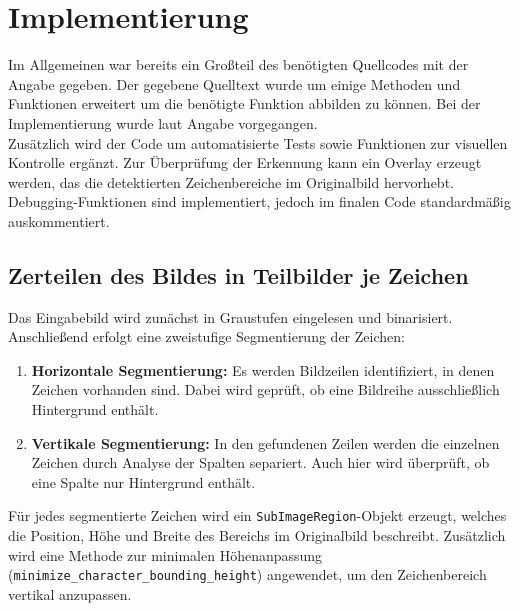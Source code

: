 \section{Implementierung}
Im Allgemeinen war bereits ein Großteil des benötigten Quellcodes mit der Angabe gegeben. Der gegebene Quelltext wurde um einige Methoden und Funktionen erweitert
um die benötigte Funktion abbilden zu können. Bei der Implementierung wurde laut Angabe vorgegangen. \\

Zusätzlich wird der Code um automatisierte Tests sowie Funktionen zur visuellen Kontrolle ergänzt. Zur Überprüfung der Erkennung kann ein Overlay erzeugt werden, das die detektierten Zeichenbereiche im Originalbild hervorhebt. Debugging-Funktionen sind implementiert, jedoch im finalen Code standardmäßig auskommentiert.

\subsection{Zerteilen des Bildes in Teilbilder je Zeichen}
Das Eingabebild wird zunächst in Graustufen eingelesen und binarisiert. Anschließend erfolgt eine zweistufige Segmentierung der Zeichen:

\begin{enumerate}
  \item \textbf{Horizontale Segmentierung:} Es werden Bildzeilen identifiziert, in denen Zeichen vorhanden sind. Dabei wird geprüft, ob eine Bildreihe ausschließlich Hintergrund enthält.
  \item \textbf{Vertikale Segmentierung:} In den gefundenen Zeilen werden die einzelnen Zeichen durch Analyse der Spalten separiert. Auch hier wird überprüft, ob eine Spalte nur Hintergrund enthält.
\end{enumerate}

Für jedes segmentierte Zeichen wird ein \texttt{SubImageRegion}-Objekt erzeugt, welches die Position, Höhe und Breite des Bereichs im Originalbild beschreibt. Zusätzlich wird eine Methode zur minimalen Höhenanpassung (\texttt{minimize\_character\_bounding\_height}) angewendet, um den Zeichenbereich vertikal anzupassen.

